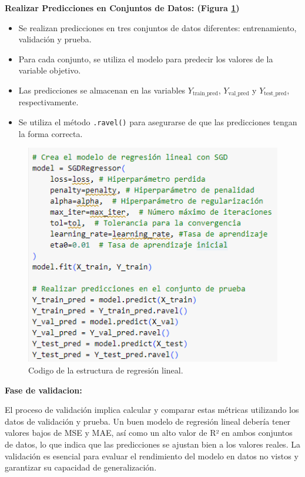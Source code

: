 \vspace{1\baselineskip}
\textbf{Realizar Predicciones en Conjuntos de Datos: (Figura \ref{fig:estructura_lineal_cap3})}

\begin{itemize}
  \item Se realizan predicciones en tres conjuntos de datos diferentes: entrenamiento,
        validación y prueba.
  \item Para cada conjunto, se utiliza el modelo para predecir los valores de la
        variable objetivo.
  \item Las predicciones se almacenan en las variables $Y_{\text{train\_pred}}$,
        $Y_{\text{val\_pred}}$ y $Y_{\text{test\_pred}}$, respectivamente.
  \item Se utiliza el método \texttt{.ravel()} para asegurarse de que las predicciones
        tengan la forma correcta.
\end{itemize}

\begin{figure}[H]
  \begin{center}
    \includegraphics[scale=0.90]{./arquitectura REGRESION LINEAL.png}
    \caption{Codigo de la estructura de regresión lineal.}
    \label{fig:estructura_lineal_cap3}
  \end{center}
\end{figure}

\textbf{Fase de validacion:}

El proceso de validación implica calcular y comparar estas métricas utilizando
los datos de validación y prueba. Un buen modelo de regresión lineal debería
tener valores bajos de MSE y MAE, así como un alto valor de R² en ambos
conjuntos de datos, lo que indica que las predicciones se ajustan bien a los
valores reales. La validación es esencial para evaluar el rendimiento del
modelo en datos no vistos y garantizar su capacidad de generalización.


